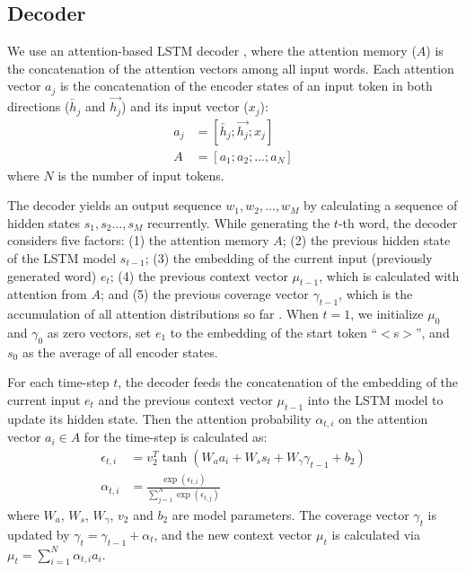 \documentclass[11pt,a4paper]{article}
\begin{document}
\subsection{Decoder}
\label{sec:base_dec}

We use an attention-based LSTM decoder \cite{bahdanau2015neural}, where the attention memory ($A$) is the concatenation of the attention vectors among all input words. 
Each attention vector $a_j$ is the concatenation of the encoder states of an
input token in both directions ($\overleftarrow{h_j}$ and $\overrightarrow{h_j}$) and its input vector ($x_j$):
\begin{align}
a_j &= [\overleftarrow{h_j}; \overrightarrow{h_j}; x_j] \\
A &= [a_1; a_2; \dots; a_N]
\end{align}
where $N$ is the number of input tokens.


The decoder yields an output sequence $w_1, w_2, \dots, w_M$ by calculating a sequence of hidden states $s_1, s_2 \dots, s_M$ recurrently.
While generating the $t$-th word, the decoder considers five factors: 
(1) the attention memory $A$; 
(2) the previous hidden state of the LSTM model $s_{t-1}$; 
(3) the embedding of the current input (previously generated word) $e_{t}$; 
(4) the previous context vector $\mu_{t-1}$, which is calculated with attention from $A$; 
and (5) the previous coverage vector $\gamma_{t-1}$, which is the accumulation of all attention distributions so far \cite{tu-EtAl:2016:P16-1}. 
When $t=1$, we initialize $\mu_{0}$ and $\gamma_{0}$ as zero vectors, set $e_{1}$ to the embedding of the start token ``$<$s$>$'', and  $s_{0}$ as the average of all encoder states.



For each time-step $t$, the decoder feeds the concatenation of the embedding of the current input $e_{t}$ and the previous context vector $\mu_{t-1}$ into the LSTM model to update its hidden state.
Then the attention probability $\alpha_{t,i}$ on the attention vector $a_i \in A$ for the time-step is calculated as:
\begin{align*}
\epsilon_{t,i} &= v_2^T \tanh(W_a a_i + W_s s_t + W_{\gamma} \gamma_{t-1} + b_2) \\
\alpha_{t,i} &= \frac{\exp(\epsilon_{t,i})}{\sum_{j=1}^N\exp(\epsilon_{t,j})} 
\end{align*}
where $W_a$, $W_s$, $W_{\gamma}$, $v_2$ and $b_2$ are model parameters.
The coverage vector $\gamma_t$ is updated by  $\gamma_t = \gamma_{t-1} + \alpha_t$, and the new context vector $\mu_t$ is calculated via $\mu_t = \sum_{i=1}^N \alpha_{t,i} a_{i}$.
\end{document}

